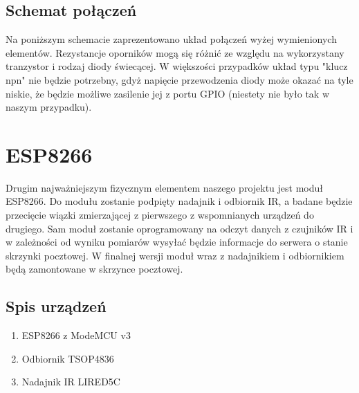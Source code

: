 \subsection{Schemat połączeń}

Na poniższym schemacie zaprezentowano układ połączeń wyżej wymienionych elementów. Rezystancje oporników mogą się różnić ze względu na wykorzystany tranzystor i rodzaj diody świecącej. W większości przypadków układ typu "klucz npn" nie będzie potrzebny, gdyż napięcie przewodzenia diody może okazać na tyle niskie, że będzie możliwe zasilenie jej z portu GPIO (niestety nie było tak w naszym przypadku).

\begin{center}
\end{center}


\section{ESP8266}

Drugim najważniejszym fizycznym elementem naszego projektu jest moduł ESP8266. Do modułu zostanie podpięty nadajnik i odbiornik IR, a badane będzie przecięcie wiązki zmierzającej z pierwszego z wspomnianych urządzeń do drugiego. Sam moduł zostanie oprogramowany na odczyt danych z czujników IR i w zależności od wyniku pomiarów wysyłać będzie informacje do serwera o stanie skrzynki pocztowej. W finalnej wersji moduł wraz z nadajnikiem i odbiornikiem będą zamontowane w skrzynce pocztowej.
\subsection{Spis urządzeń}

\begin{enumerate}
	\item ESP8266 z ModeMCU v3 \\
	\begin{center}
	\end{center}
	\item Odbiornik TSOP4836 \\
	\begin{center}
	\end{center}
	\item Nadajnik IR LIRED5C \\
	\begin{center}
	\end{center}
\end{enumerate}

